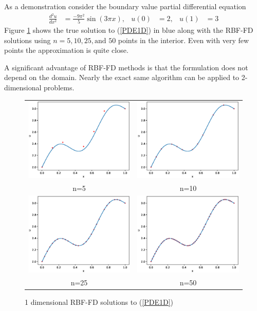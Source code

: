 \documentclass[12pt]{article}
\begin{document}
As a demonstration consider the boundary value partial differential equation
\begin{align}
\frac{d^2u}{dx^2} &= \frac{-9\pi^2}{5}\sin(3\pi x), & u(0)&=2, & u(1)&=3 \label{PDE1D}
\end{align}
Figure \ref{1Dsolutions} shows the true solution to (\ref{PDE1D}) in blue along with the RBF-FD solutions using $n=5,10,25, \text{and } 50$ points in the interior. Even with very few points the approximation is quite close. \bigbreak

A significant advantage of RBF-FD methods is that the formulation does not depend on the domain. Nearly the exact same algorithm can be applied to 2-dimensional problems. \bigbreak

\begin{figure}[p]
	\caption{1 dimensional RBF-FD solutions to (\ref{PDE1D})}
	\begin{tabular}{cc}
		\includegraphics[width=.4\textwidth]{1D_n5} & \includegraphics[width=.4\textwidth]{1D_n10} \\
		n=5 & n=10 \\
		\includegraphics[width=.4\textwidth]{1D_n25} & \includegraphics[width=.4\textwidth]{1D_n50} \\
		n=25 & n=50
	\end{tabular}
	\label{1Dsolutions}
	\centering
\end{figure}
\end{document}
